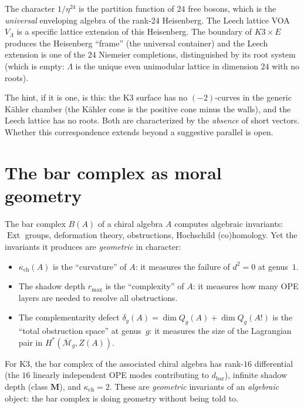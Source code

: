 \documentclass[11pt]{article}
\newcommand{\cM}{\mathcal{M}}
\newcommand{\Ext}{\operatorname{Ext}}
\begin{document}
\begin{remark}
The character $1/\eta^{24}$ is the partition function of $24$ free bosons, which is the \emph{universal} enveloping algebra of the rank-24 Heisenberg. The Leech lattice VOA $V_\Lambda$ is a specific lattice extension of this Heisenberg. The boundary of $K3 \times E$ produces the Heisenberg ``frame'' (the universal container) and the Leech extension is one of the $24$ Niemeier completions, distinguished by its root system (which is empty: $\Lambda$ is the unique even unimodular lattice in dimension $24$ with no roots).

The hint, if it is one, is this: the K3 surface has no $(-2)$-curves in the generic K\"ahler chamber (the K\"ahler cone is the positive cone minus the walls), and the Leech lattice has no roots. Both are characterized by the \emph{absence} of short vectors. Whether this correspondence extends beyond a suggestive parallel is open.
\end{remark}


\section{The bar complex as moral geometry}
\label{sec:motivic-bar-geometry}

The bar complex $B(A)$ of a chiral algebra $A$ computes algebraic invariants: $\Ext$ groups, deformation theory, obstructions, Hochschild (co)homology. Yet the invariants it produces are \emph{geometric} in character:

\begin{itemize}
\item $\kappa_{\mathrm{ch}}(A)$ is the ``curvature'' of $A$: it measures the failure of $d^2 = 0$ at genus~$1$.
\item The shadow depth $r_{\max}$ is the ``complexity'' of $A$: it measures how many OPE layers are needed to resolve all obstructions.
\item The complementarity defect $\delta_g(A) = \dim Q_g(A) + \dim Q_g(A!)$ is the ``total obstruction space'' at genus~$g$: it measures the size of the Lagrangian pair in $H^*(\overline{\cM}_g, Z(A))$.
\end{itemize}

For K3, the bar complex of the associated chiral algebra has rank-$16$ differential (the $16$ linearly independent OPE modes contributing to $d_{\mathrm{bar}}$), infinite shadow depth (class $\mathbf{M}$), and $\kappa_{\mathrm{ch}} = 2$. These are \emph{geometric} invariants of an \emph{algebraic} object: the bar complex is doing geometry without being told to.
\end{document}

